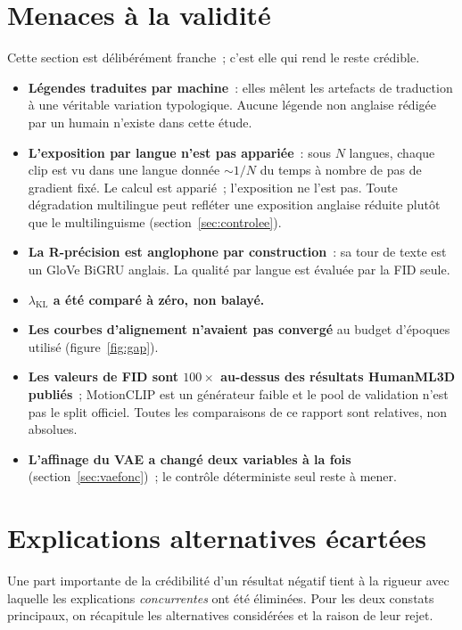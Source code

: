 \documentclass[12pt,a4paper,oneside]{report}
\theoremstyle{definition}
\theoremstyle{plain}
\newcommand{\lkl}{\ensuremath{\lambda_{\mathrm{KL}}}}
\begin{document}
\section{Menaces à la validité}
\label{sec:threats}

Cette section est délibérément franche~; c'est elle qui rend le reste crédible.

\begin{itemize}[leftmargin=*]
\item \textbf{Légendes traduites par machine}~: elles mêlent les artefacts de
traduction à une véritable variation typologique. Aucune légende non anglaise
rédigée par un humain n'existe dans cette étude.
\item \textbf{L'exposition par langue n'est pas appariée}~: sous $N$ langues,
chaque clip est vu dans une langue donnée ${\sim}1/N$ du temps à nombre de pas de
gradient fixé. Le calcul est apparié~; l'exposition ne l'est pas. Toute dégradation
multilingue peut refléter une exposition anglaise réduite plutôt que le
multilinguisme (section~\ref{sec:controlee}).
\item \textbf{La R-précision est anglophone par construction}~: sa tour de texte
est un GloVe BiGRU anglais. La qualité par langue est évaluée par la FID seule.
\item \textbf{\lkl{} a été comparé à zéro, non balayé.}
\item \textbf{Les courbes d'alignement n'avaient pas convergé} au budget d'époques
utilisé (figure~\ref{fig:gap}).
\item \textbf{Les valeurs de FID sont $100\times$ au-dessus des résultats HumanML3D
publiés}~; MotionCLIP est un générateur faible et le pool de validation n'est pas
le split officiel. Toutes les comparaisons de ce rapport sont relatives, non
absolues.
\item \textbf{L'affinage du VAE a changé deux variables à la fois}
(section~\ref{sec:vaefonc})~; le contrôle déterministe seul reste à mener.
\end{itemize}

\section{Explications alternatives écartées}
\label{sec:alternatives}

Une part importante de la crédibilité d'un résultat négatif tient à la rigueur avec
laquelle les explications \emph{concurrentes} ont été éliminées. Pour les deux
constats principaux, on récapitule les alternatives considérées et la raison de leur
rejet.
\end{document}
